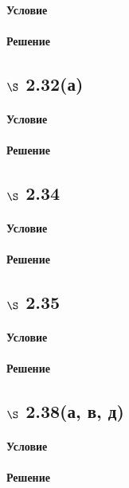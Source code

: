 \documentclass[a4paper,12pt]{article}
\begin{document}
\paragraph*{Условие}
\paragraph*{Решение}

\subsection*{$\S$ 2.32(а)}
\paragraph*{Условие}
\paragraph*{Решение}

\subsection*{$\S$ 2.34}
\paragraph*{Условие}
\paragraph*{Решение}

\subsection*{$\S$ 2.35}
\paragraph*{Условие}
\paragraph*{Решение}

\subsection*{$\S$ 2.38(а, в, д)}
\paragraph*{Условие}
\paragraph*{Решение}
\end{document}
